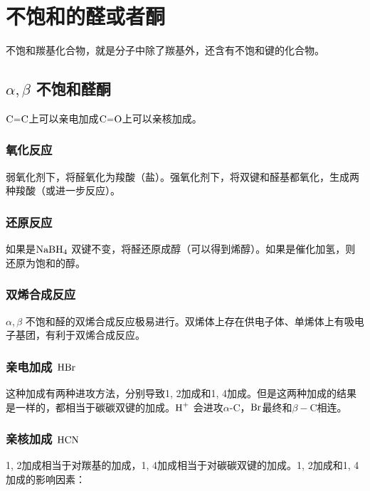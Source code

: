 
    \section{不饱和的醛或者酮}

    不饱和羰基化合物，就是分子中除了羰基外，还含有不饱和键的化合物。

    \subsection{$\alpha, \beta$ 不饱和醛酮}

    $\ce{C=C}$上可以亲电加成$\ce{C=O}$上可以亲核加成。

    \subsubsection{氧化反应}

    弱氧化剂下，将醛氧化为羧酸（盐）。强氧化剂下，将双键和醛基都氧化，生成两种羧酸（或进一步反应）。

    \subsubsection{还原反应}

    如果是$\ce{NaBH4}$ 双键不变，将醛还原成醇（可以得到烯醇）。如果是催化加氢，则还原为饱和的醇。

    \subsubsection{双烯合成反应}

    $\alpha, \beta$ 不饱和醛的双烯合成反应极易进行。双烯体上存在供电子体、单烯体上有吸电子基团，有利于双烯合成反应。

    \subsubsection{亲电加成 $\ce{HBr}$}

    这种加成有两种进攻方法，分别导致1, 2加成和1, 4加成。但是这两种加成的结果是一样的，都相当于碳碳双键的加成。$\ce{H+}$ 会进攻$\alpha$-C，$\ce{Br}$最终和$\beta-$C相连。

    \subsubsection{亲核加成 $\ce{HCN}$}

    1, 2加成相当于对羰基的加成，1, 4加成相当于对碳碳双键的加成。1, 2加成和1, 4加成的影响因素：

